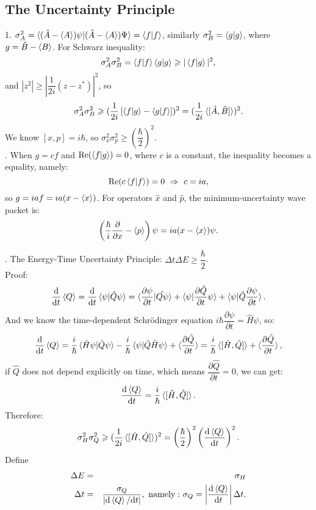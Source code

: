 \documentclass[12pt, 
]{article}
\begin{document}
\subsection{The Uncertainty Principle}
1. $\sigma_A^2=\braket{(\hat{A}-\braket{A})\psi|(\hat{A}-\braket{A})\Psi}=\braket{f|f}$, similarly $\sigma_B^2=\braket{g|g}$, where $g=\hat{B}-\braket{B}$. For Schwarz inequality:
\[
	\sigma_A^2\sigma_B^2=\braket{f|f}\braket{g|g}\geqslant|\braket{f|g}|^2,
\]
and $|z^2|\geqslant\left|\dfrac{1}{2i}(z-z^*)\right|^2$, so
\[
	\sigma^2_A\sigma^2_B\geqslant(\frac{1}{2i}\left[\braket{f|g}-\braket{g|f}\right])^2=(\frac{1}{2i}\braket{[\hat{A},\hat{B}]})^2.
\]
We know $[x,p]=i\hbar$, so $\sigma_x^2\sigma_p^2\geqslant\left(\dfrac{\hbar}{2}\right)^2$.
~\\

. When $g=cf$ and ${\rm Re}(\braket{f|g})=0$, where $c$ is a constant, the inequality becomes a equality, namely:
\[
	{\rm Re}(c\braket{f|f})=0~\Rightarrow~c=ia 
,\]
so $g=iaf=ia(x-\braket{x})$. For operators $\hat{x}$ and $\hat{p}$, the minimum-uncertainty wave packet is: $$\left(\frac{\hbar}{i}\frac{\partial}{\partial x}-\braket{p}\right)\psi=ia(x-\braket{x})\psi.$$

. The Energy-Time Uncertainty Principle: $\Delta t\Delta E\geqslant \dfrac{\hbar}{2}$.\\
Proof: \[
	\frac{{\rm d}}{{\rm d}t}\braket{Q}=\frac{{\rm d}}{{\rm d}t}\braket{\psi|\hat{Q}\psi}=\braket{\frac{\partial\psi}{\partial t}|\hat{Q\psi}}+\braket{\psi|\frac{\partial\hat{Q}}{\partial t}\psi}+\braket{\psi|\hat{Q}\frac{\partial\psi}{\partial t}}.
\]
And we know the time-dependent Schr\"odinger equation $i\hbar \dfrac{\partial \psi}{\partial t}=\hat{H}\psi$, so:
\[
	\frac{{\rm d}}{{\rm d}t}\braket{Q}=\frac{i}{\hbar}\braket{\hat{H}\psi|\hat{Q}\psi}-\frac{i}{\hbar}\braket{\psi|\hat{Q}\hat{H}\psi}+\braket{\frac{\partial\hat{Q}}{\partial t}}=\frac{i}{\hbar}\braket{[\hat{H},\hat{Q}]}+\braket{\frac{\partial\hat{Q}}{\partial t}}
,\]
if $\hat{Q}$ does not depend explicitly on time, which means $\dfrac{{\partial}\hat{Q}}{\partial t}=0$, we can get:
\begin{equation}\label{eq:15}
	\frac{{\rm d}\braket{Q}}{{\rm d} t}=\frac{i}{\hbar}\braket{[\hat{H},\hat{Q}]}.
\end{equation}
Therefore:
\[
	\sigma_H^2\sigma_Q^2\geqslant(\frac{1}{2i}\braket{[\hat{H},\hat{Q}]})^2=\left(\frac{\hbar}{2}\right)^2\left(\frac{{\rm d}\braket{Q}}{{\rm d} t}\right)^2.
\]
Define
\begin{eqnarray*}
	\Delta E&=&\sigma_H\\
	\Delta t&=&\frac{\sigma_Q}{|{\rm d}\braket{Q}/{\rm d}t|}, ~{\rm namely:}~\sigma_Q=\left|\frac{{\rm d}\braket{Q}}{{\rm d}t}\right|\Delta t.
\end{eqnarray*}
~\\
\end{document}

